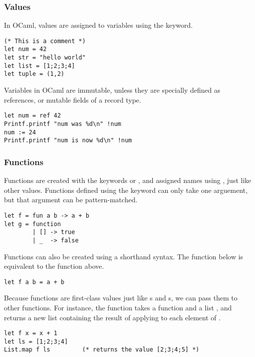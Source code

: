 \subsubsection{Values}

In OCaml, values are assigned to variables using the 
keyword.

\begin{lstlisting}
(* This is a comment *)
let num = 42
let str = "hello world"
let list = [1;2;3;4]
let tuple = (1,2)
\end{lstlisting}

Variables in OCaml are immutable, unless they are specially defined as
references, or mutable fields of a record type.

\begin{lstlisting}
let num = ref 42
Printf.printf "num was %d\n" !num
num := 24
Printf.printf "num is now %d\n" !num
\end{lstlisting}

\subsubsection{Functions}

Functions are created with the keywords  or ,
and assigned names using , just like other values. Functions
defined using the  keyword can only take one arguement,
but that argument can be pattern-matched.

\begin{lstlisting}
let f = fun a b -> a + b
let g = function
        | [] -> true
        | _  -> false
\end{lstlisting}

Functions can also be created using a shorthand  syntax. The
function  below is equivalent to the function  above.

\begin{lstlisting}
let f a b = a + b
\end{lstlisting}

Because functions are first-class values just like s and
s, we can pass them to other functions. For instance, the
function  takes a function  and a list
, and returns a new list containing the result of applying
 to each element of .

\begin{lstlisting}
let f x = x + 1
let ls = [1;2;3;4]
List.map f ls         (* returns the value [2;3;4;5] *)
\end{lstlisting}

